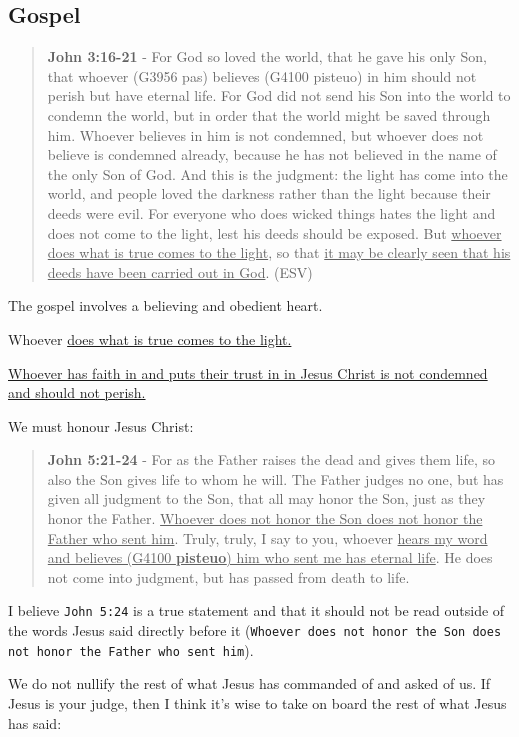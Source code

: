 \documentclass[11pt]{article}
\begin{document}
\subsection{Gospel}
\label{sec:org7fb9547}
\begin{quote}
\textbf{John 3:16-21} - For God so loved the world, that he gave his only Son, that whoever (G3956 pas) believes (G4100 pisteuo) in him should not perish but have eternal life. For God did not send his Son into the world to condemn the world, but in order that the world might be saved through him. Whoever believes in him is not condemned, but whoever does not believe is condemned already, because he has not believed in the name of the only Son of God. And this is the judgment: the light has come into the world, and people loved the darkness rather than the light because their deeds were evil. For everyone who does wicked things hates the light and does not come to the light, lest his deeds should be exposed. But \uline{whoever does what is true comes to the light}, so that \uline{it may be clearly seen that his deeds have been carried out in God}. (ESV)
\end{quote}

The gospel involves a believing and obedient heart.

Whoever \uline{does what is true comes to the light.}

\uline{Whoever has faith in and puts their trust in in Jesus Christ is not condemned and should not perish.}

We must honour Jesus Christ:

\begin{quote}
\textbf{John 5:21-24} - For as the Father raises the dead and gives them life, so also the Son gives life to whom he will. The Father judges no one, but has given all judgment to the Son, that all may honor the Son, just as they honor the Father. \uline{Whoever does not honor the Son does not honor the Father who sent him}. Truly, truly, I say to you, whoever \uline{hears my word and believes (G4100 \textbf{pisteuo}) him who sent me has eternal life}. He does not come into judgment, but has passed from death to life.
\end{quote}

I believe \texttt{John 5:24} is a true statement and that it should not be read outside of the words Jesus said directly before it (\texttt{Whoever does not honor the Son does not honor the Father who sent him}).

We do not nullify the rest of what Jesus has commanded of and asked of us. If Jesus is your judge, then I think it's wise to take on board the rest of what Jesus has said:
\end{document}
